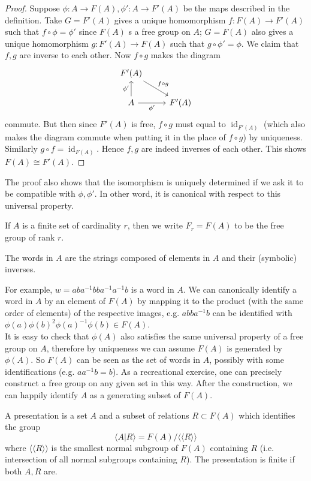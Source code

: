 \begin{proof}
    Suppose $\phi:A\to F(A),\phi':A\to F'(A)$ be the maps described in the definition.
    Take $G=F'(A)$ gives a unique homomorphism $f:F(A)\to F'(A)$ such that $f\circ\phi=\phi'$ since $F(A)$ s a free group on $A$; $G=F(A)$ also gives a unique homomorphism $g:F'(A)\to F(A)$ such that $g\circ\phi'=\phi$.
    We claim that $f,g$ are inverse to each other.
    Now $f\circ g$ makes the diagram
    \[
        \begin{tikzcd}
            F'(A)\arrow{dr}{f\circ g}&\\
            A\arrow{u}{\phi'}\arrow[swap]{r}{\phi'}&F'(A)
        \end{tikzcd}
    \]
    commute.
    But then since $F'(A)$ is free, $f\circ g$ must equal to $\operatorname{id}_{F'(A)}$ (which also makes the diagram commute when putting it in the place of $f\circ g$) by uniqueness.
    Similarly $g\circ f=\operatorname{id}_{F(A)}$.
    Hence $f,g$ are indeed inverses of each other.
    This shows $F(A)\cong F'(A)$.
\end{proof}
The proof also shows that the isomorphism is uniquely determined if we ask it to be compatible with $\phi,\phi'$.
In other word, it is canonical with respect to this universal property.
\begin{definition}
    If $A$ is a finite set of cardinality $r$, then we write $F_r=F(A)$ to be the free group of rank $r$.
\end{definition}
\begin{definition}
    The words in $A$ are the strings composed of elements in $A$ and their (symbolic) inverses.
\end{definition}
For example, $w=aba^{-1}bba^{-1}a^{-1}b$ is a word in $A$.
We can canonically identify a word in $A$ by an element of $F(A)$ by mapping it to the product (with the same order of elements) of the respective images, e.g. $abba^{-1}b$ can be identified with $\phi(a)\phi(b)^2\phi(a)^{-1}\phi(b)\in F(A)$.\\
It is easy to check that $\phi(A)$ also satisfies the same universal property of a free group on $A$, therefore by uniqueness we can assume $F(A)$ is generated by $\phi(A)$.
So $F(A)$ can be seen as the set of words in $A$, possibly with some identifications (e.g. $aa^{-1}b=b$).
As a recreational exercise, one can precisely construct a free group on any given set in this way.
After the construction, we can happily identify $A$ as a generating subset of $F(A)$.
\begin{definition}
    A presentation is a set $A$ and a subset of relations $R\subset F(A)$ which identifies the group
    $$\langle A|R\rangle=F(A)/\langle\langle R\rangle\rangle$$
    where $\langle\langle R\rangle\rangle$ is the smallest normal subgroup of $F(A)$ containing $R$ (i.e. intersection of all normal subgroups containing $R$).
    The presentation is finite if both $A,R$ are.
\end{definition}
